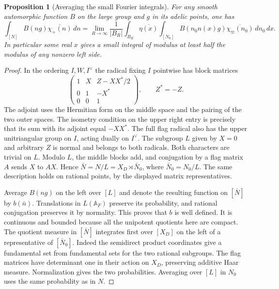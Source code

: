 \documentclass[a4paper,11pt]{article}
\newtheorem{proposition}{Proposition}[section]
\theoremstyle{definition}
\theoremstyle{remark}
\numberwithin{equation}{section}
\begin{document}
\begin{proposition}[Averaging the small Fourier integrals]\leavevmode
\label{prop:fiber274}
For any smooth automorphic function \(B\) on the large group
and \(g\) in its adelic points, one has
\[
 \int_{[N]} B(ng)\overline{\chi_+(n)}\,dn
  =\lim_{R\to\infty}\frac1{|B_R|}\int_{B_R}\overline{\eta(x)}
      \int_{[N_0]} B(n_0 n(x)g)\overline{\chi_\varpi(n_0)}
                                            \,dn_0\,dx .
\]
In particular some real \(x\) gives a small integral of
modulus at least half the modulus of any nonzero left side.
\end{proposition}
\begin{proof}
In the ordering \(I,W,I^\vee\) the radical fixing \(I\)
pointwise has block matrices
\[
   \begin{pmatrix}
     1&X&Z-XX^\ast/2\\
     0&1&-X^\ast\\
     0&0&1
   \end{pmatrix},\qquad Z^\ast=-Z .
\]
The adjoint uses the Hermitian form on the middle space
and the pairing of the two outer spaces. The isometry condition
on the upper right entry is precisely that its sum with its
adjoint equal \(-XX^\ast\). The full flag radical also has
the upper unitriangular group on \(I\), acting dually on
\(I^\vee\). The subgroup \(L\) given by \(X=0\) and arbitrary
\(Z\) is normal and belongs to both radicals. Both characters
are trivial on \(L\). Modulo \(L\), the middle blocks add,
and conjugation by a flag matrix \(A\) sends \(X\) to \(AX\).
Hence \(\bar N=N/L=X_D\rtimes\bar N_0\), where
\(\bar N_0=N_0/L\). The same description holds on rational
points, by the displayed matrix representatives.

Average \(B(ng)\) on the left over \([L]\) and denote the
resulting function on \([\bar N]\) by \(b(\bar n)\).
Translations in \(L(\mathbb A_F)\) preserve its probability,
and rational conjugation preserves it by normality. This
proves that \(b\) is well defined. It is continuous and
bounded because all the unipotent quotients here are compact.
The quotient measure in \([\bar N]\) integrates first over
\([X_D]\) on the left of a representative of \([\bar N_0]\).
Indeed the semidirect product coordinates give a fundamental
set from fundamental sets for the two rational subgroups.
The flag matrices have determinant one in their action on
\(X_D\), preserving additive Haar measure. Normalization gives
the two probabilities. Averaging over \([L]\) in \(N_0\)
uses the same probability as in \(N\).


\end{proof}
\end{document}
